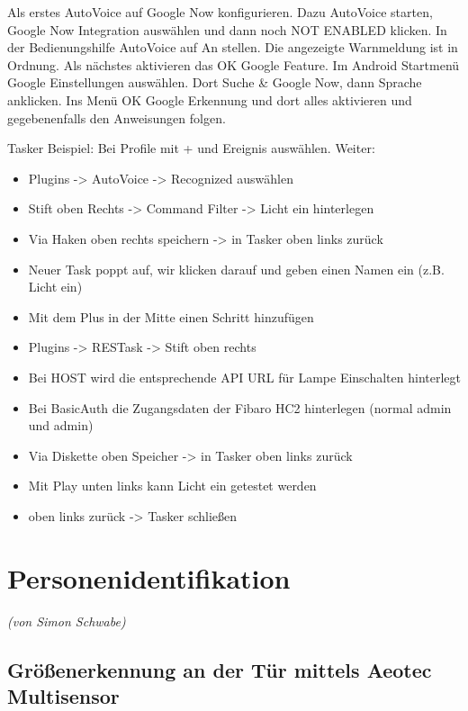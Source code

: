 Als erstes AutoVoice auf Google Now konfigurieren. Dazu AutoVoice starten, \glqq Google Now
Integration\grqq{} auswählen und dann noch \glqq NOT ENABLED\grqq{} klicken. In der Bedienungshilfe AutoVoice auf \glqq An\grqq{} stellen. Die angezeigte Warnmeldung ist in Ordnung. Als nächstes aktivieren das \glqq OK Google\grqq{} Feature. Im Android Startmenü \glqq Google Einstellungen\grqq{} auswählen. Dort \glqq Suche \& Google
Now\grqq , dann \glqq Sprache\grqq{} anklicken. Ins Menü \glqq OK Google Erkennung\grqq{} und dort alles aktivieren und gegebenenfalls den Anweisungen folgen.

Tasker Beispiel: Bei \glqq Profile\grqq{} mit \glqq +\grqq{} und \glqq Ereignis\grqq{} auswählen. Weiter:

\begin{itemize}
\item Plugins -> AutoVoice -> \glqq Recognized\grqq{} auswählen
\item Stift oben Rechts -> Command Filter -> \glqq Licht ein\grqq{} hinterlegen
\item Via Haken oben rechts speichern -> in Tasker oben links zurück
\item \glqq Neuer Task\grqq{} poppt auf, wir klicken darauf und geben einen Namen ein (z.B. \glqq Licht ein\grqq)
\item Mit dem Plus in der Mitte einen Schritt hinzufügen
\item Plugins -> RESTask -> Stift oben rechts
\item Bei HOST wird die entsprechende API URL für \glqq Lampe Einschalten\grqq{} hinterlegt
\item Bei BasicAuth die Zugangsdaten der Fibaro HC2 hinterlegen (normal \glqq admin\grqq{} und \glqq admin\grqq)
\item Via Diskette oben Speicher -> in Tasker oben links zurück
\item Mit Play unten links kann \glqq Licht ein\grqq{} getestet werden
\item oben links zurück -> Tasker schließen
\end{itemize}

\newpage
\section{Personenidentifikation}

\emph{(von Simon Schwabe)}
\subsection{Größenerkennung an der Tür mittels Aeotec Multisensor}
\label{subsec:groessenerkennungAnTuer}
